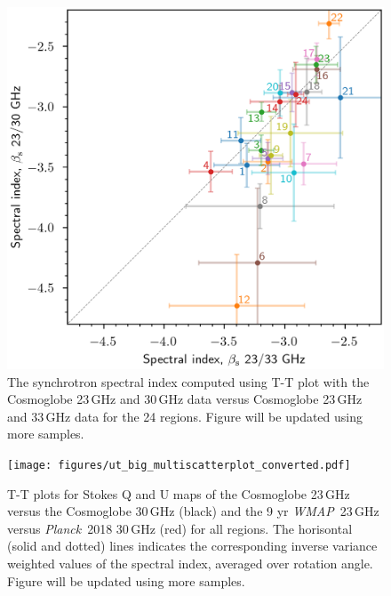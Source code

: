 \documentclass[twocolumn]{../../common/aa}
\def\WMAP{\emph{WMAP}}
\def\Planck{\emph{Planck}}
\newcommand{\red}[0]{\color{red}}
\begin{document}
\begin{figure}
        \centering
        \includegraphics[width=\linewidth]{figures/xy_regions.png}
        \caption{
The synchrotron spectral index computed using T-T plot with the Cosmoglobe 23\,GHz and 30\,GHz data versus Cosmoglobe 23\,GHz and 33\,GHz data for the 24 regions.  {\red Figure will be updated using more samples.}}
        \label{fig:cos30_xyplot}
\end{figure}

\begin{figure}
        \centering
        \texttt{[image: figures/ut\_big\_multiscatterplot\_converted.pdf]}
        \caption{T-T plots for Stokes Q and U maps of the Cosmoglobe 23\,GHz versus the Cosmoglobe 30\,GHz (black) and the 9 yr \WMAP\ 23\,GHz versus \Planck\ 2018 30\,GHz (red) for all regions. The horisontal (solid and dotted) lines indicates the corresponding inverse variance weighted values of the spectral index, averaged over rotation angle. {\red Figure will be updated using more samples.}}
        \label{fig:cos30_beta_bigscatter}
\end{figure}
\end{document}
